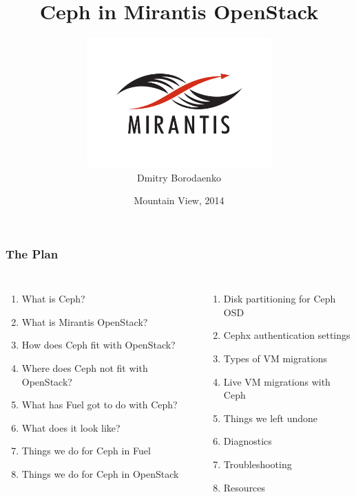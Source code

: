 \documentclass[hyperref=unicode,utf8,xcolor=pst,aspectratio=169]{beamer}
\title{\fontsize{26}{0}\selectfont Ceph in Mirantis OpenStack}
\author{\vspace{-1mm}\includegraphics[height=5cm]{Vector_RGB_MirantisLogo}\\Dmitry Borodaenko\vspace{-10mm}}
\date{Mountain View, 2014}
\newcounter{savedenum}
\newcommand*{\saveenum}{\setcounter{savedenum}{\theenumi}}
\newcommand*{\resume}{\setcounter{enumi}{\thesavedenum}}
\begin{document}
\begin{frame}
	\titlepage
\end{frame}

\begin{frame}
	\frametitle{The Plan}
	\begin{columns}[T]
		\begin{enumerate}
			\item What is Ceph?
			\item What is Mirantis OpenStack?
			\item How does Ceph fit with OpenStack?
			\item Where does Ceph not fit with OpenStack?
			\item What has Fuel got to do with Ceph?
			\item What does it look like?
			\item Things we do for Ceph in Fuel
			\item Things we do for Ceph in OpenStack
			\saveenum
		\end{enumerate}

		\begin{enumerate}
			\resume
			\item Disk partitioning for Ceph OSD
			\item Cephx authentication settings
			\item Types of VM migrations
			\item Live VM migrations with Ceph
			\item Things we left undone
			\item Diagnostics
			\item Troubleshooting
			\item Resources
		\end{enumerate}
	\end{columns}
\end{frame}
\end{document}

